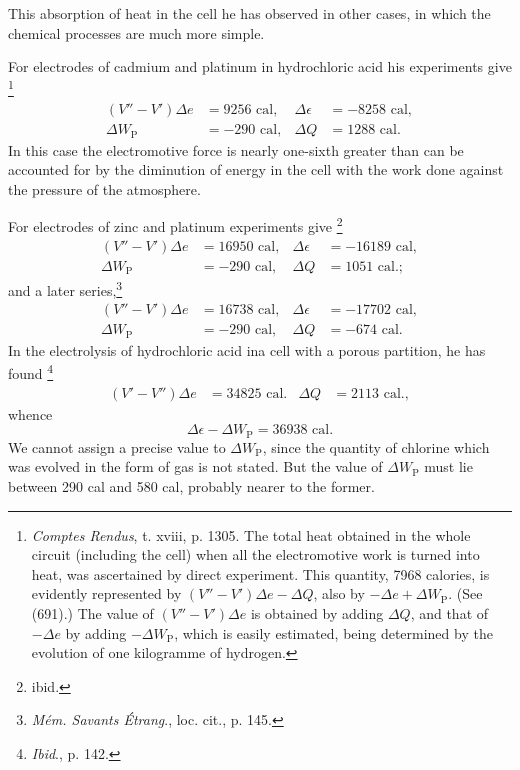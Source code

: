 \documentclass[12pt]{memoir}
\begin{document}
This absorption of heat in the cell he has observed in other cases, in which the chemical processes are much more simple.

For electrodes of cadmium and platinum in hydrochloric acid his
experiments give \footnote{\textit{Comptes Rendus}, t. xviii, p. 1305. The total heat obtained in the whole circuit (including the cell) when all the electromotive work is turned into heat, was ascertained by direct experiment. This quantity, 7968 calories, is evidently represented by $( V''- V') \Delta e - \Delta Q$, also by $- \Delta e + \Delta W_\text{P}$. (See (691).) The value of $(V''  - V')\Delta e$ is obtained by adding $\Delta Q$, and that of $- \Delta e$ by adding $- \Delta W_\text{P}$, which is easily estimated, being determined by the evolution of one kilogramme of hydrogen.}
\begin{align*}(V'' - V')\Delta e &= 9256 \text{ cal},  &   \Delta \epsilon &= -8258\text{ cal},\\
\Delta W_\text{P} &= -290\text{ cal},    &   \Delta Q &= 1288\text{ cal}.\end{align*}
In this case the electromotive force is nearly one-sixth greater than can be accounted for by the diminution of energy in the cell with the work done against the pressure of the atmosphere.

For electrodes of zinc and platinum experiments give \footnote{ibid.}
\begin{align*}(V'' - V')\Delta e &= 16950 \text{ cal},  &   \Delta \epsilon &= -16189\text{ cal},\\
\Delta W_\text{P} &= -290\text{ cal},    &   \Delta Q &= 1051\text{ cal}.;\end{align*}
and a later series,\footnote{\textit{M\'{e}m. Savants \'{E}trang}., loc. cit., p. 145.}
\begin{align*}(V'' - V')\Delta e &= 16738 \text{ cal},  &   \Delta \epsilon &= -17702\text{ cal},\\
\Delta W_\text{P} &= -290\text{ cal},    &   \Delta Q &= -674\text{ cal}.\end{align*}
In the electrolysis of hydrochloric acid ina cell with a porous partition, he has found \footnote{\textit{Ibid}., p. 142.}
\begin{align*} (V' - V'') \Delta e & = 34825\text{ cal}. & \Delta Q &= 2113\text{ cal}.,\end{align*}
whence
$$\Delta \epsilon - \Delta W_\text{P} = 36938\text{ cal}.$$
We cannot assign a precise value to $\Delta W_\text{P}$, since the quantity of chlorine which was evolved in the form of gas is not stated. But the value of $\Delta W_\text{P}$ must lie between 290 cal and 580 cal, probably nearer to the former.
\end{document}
